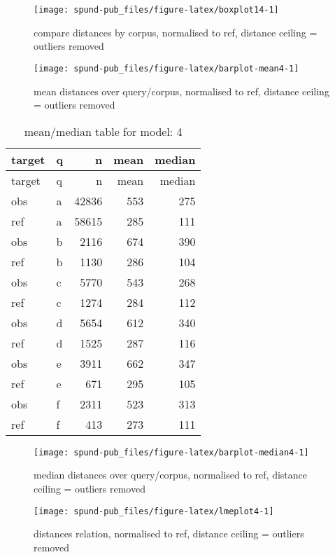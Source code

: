 \documentclass[
  12pt,
  oneside]{book}
\begin{document}
\begin{figure}[H]
\texttt{[image: spund-pub\_files/figure-latex/boxplot14-1]} \caption{compare distances by corpus, normalised to ref, distance ceiling =  outliers removed}\label{fig:boxplot14}
\end{figure}

\begin{figure}[H]
\texttt{[image: spund-pub\_files/figure-latex/barplot-mean4-1]} \caption{mean distances over query/corpus, normalised to ref, distance ceiling =  outliers removed}\label{fig:barplot-mean4}
\end{figure}

\begin{longtable}[]{@{}llrrr@{}}
\caption{\label{tab:dfe-table4}mean/median table for model: 4}\tabularnewline
\toprule\noalign{}
target & q & n & mean & median \\
\midrule\noalign{}
\endfirsthead
\toprule\noalign{}
target & q & n & mean & median \\
\midrule\noalign{}
\endhead
\bottomrule\noalign{}
\endlastfoot
obs & a & 42836 & 553 & 275 \\
ref & a & 58615 & 285 & 111 \\
obs & b & 2116 & 674 & 390 \\
ref & b & 1130 & 286 & 104 \\
obs & c & 5770 & 543 & 268 \\
ref & c & 1274 & 284 & 112 \\
obs & d & 5654 & 612 & 340 \\
ref & d & 1525 & 287 & 116 \\
obs & e & 3911 & 662 & 347 \\
ref & e & 671 & 295 & 105 \\
obs & f & 2311 & 523 & 313 \\
ref & f & 413 & 273 & 111 \\
\end{longtable}

\begin{figure}[H]
\texttt{[image: spund-pub\_files/figure-latex/barplot-median4-1]} \caption{median distances over query/corpus, normalised to ref, distance ceiling =  outliers removed}\label{fig:barplot-median4}
\end{figure}

\begin{figure}[H]
\texttt{[image: spund-pub\_files/figure-latex/lmeplot4-1]} \caption{distances relation, normalised to ref, distance ceiling =  outliers removed}\label{fig:lmeplot4}
\end{figure}
\end{document}
